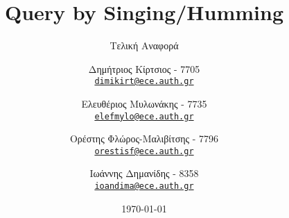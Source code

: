 

\subject{Τεχνολογία του Ήχου και της Εικόνας}
\title{Query by Singing/Humming}
\subtitle{Τελική Αναφορά}
\author{
	Δημήτριος Κίρτσιος - 7705\\ \texttt{\href{mailto:dimikirt@ece.auth.gr}{dimikirt@ece.auth.gr}}
	\and Ελευθέριος Μυλωνάκης - 7735\\ \texttt{\href{mailto:elefmylo@ece.auth.gr}{elefmylo@ece.auth.gr}}
	\and Ορέστης Φλώρος-Μαλιβίτσης - 7796\\ \texttt{\href{mailto:orestisf@ece.auth.gr}{orestisf@ece.auth.gr}}
	\and Ιωάννης Δημανίδης - 8358\\ \texttt{\href{mailto:ioandima@ece.auth.gr}{ioandima@ece.auth.gr}}
}
\date{\vspace{10cm}\today}


	\maketitle
	\tableofcontents
	\listoffigures
	\clearpage
	\setcounter{page}{1}

	
    
	
    
    
	
	
	

    

